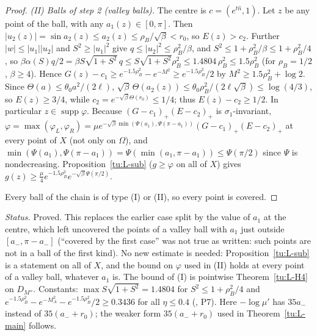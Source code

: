 \begin{proof}
\emph{(II) Balls of step 2 (valley balls).} The centre is $c=(e^{t\hat n},1)$. Let $z$ be any point of the ball, with any $a_1(z)\in[0,\pi]$.
Then $|u_2(z)|=\sin a_2(z)\le a_2(z)\le\rho_B/\sqrt\beta<r_0$, so $E(z)>c_2$. Further $|w|\le|u_1||u_2|$ and $S^2\ge|u_1|^2$ give
$q\le|u_2|^2\le\rho_B^2/\beta$, and $S^2\le1+\rho_B^2/\beta\le1+\rho_B^2/4$, so
$\beta\alpha(S)q/2=\beta S\sqrt{1+S^2}\,q\le S\sqrt{1+S^2}\rho_B^2\le1.4804\,\rho_B^2\le1.5\rho_B^2$ (for $\rho_B=1/2$, $\beta\ge4$).
Hence $G(z)-c_1\ge e^{-1.5\rho_B^2}-e^{-M^2}\ge e^{-1.5\rho_B^2}/2$ by $M^2\ge1.5\rho_B^2+\log2$. Since
$\Theta(a)\le\theta_0a^2/(2\ell)$, $\sqrt\beta\,\Theta(a_2(z))\le\theta_0\rho_B^2/(2\ell\sqrt\beta)\le\log(4/3)$, so $E(z)\ge3/4$, while
$c_2=e^{-\sqrt\beta\Theta(r_0)}\le1/4$; thus $E(z)-c_2\ge1/2$. In particular $z\in\operatorname{supp}\varphi$. Because
$(G-c_1)_+(E-c_2)_+$ is $\sigma_1$-invariant, $\varphi=\max(\varphi_L,\varphi_R)=\mu e^{-\sqrt\beta\min(\Psi(a_1),\Psi(\pi-a_1))}(G-c_1)_+(E-c_2)_+$
at every point of $X$ (not only on $\Omega$), and $\min(\Psi(a_1),\Psi(\pi-a_1))=\Psi(\min(a_1,\pi-a_1))\le\Psi(\pi/2)$ since $\Psi$ is
nondecreasing. Proposition~\ref{tu:L-sub} ($g\ge\varphi$ on all of $X$) gives
$g(z)\ge\frac\mu4e^{-1.5\rho_B^2}e^{-\sqrt\beta\Psi(\pi/2)}$.

Every ball of the chain is of type (I) or (II), so every point is covered.
\end{proof}

\noindent\emph{Status.} Proved. This replaces the earlier case split by the value of $a_1$ at the centre, which left uncovered
the points of a valley ball with $a_1$ just outside $[a_-,\pi-a_-]$ (``covered by the first case'' was not true as written: such
points are not in a ball of the first kind). No new estimate is needed: Proposition~\ref{tu:L-sub} is a statement on all of $X$,
and the bound on $\varphi$ used in (II) holds at every point of a valley ball, whatever $a_1$ is. The bound of (I) is pointwise
Theorem~\ref{tu:L-H4} on $D_{M''}$. Constants: $\max S\sqrt{1+S^2}=1.4804$ for $S^2\le1+\rho_B^2/4$ and
$e^{-1.5\rho_B^2}-e^{-M_A^2}-e^{-1.5\rho_B^2}/2\ge0.3436$ for all $\eta\le0.4$ (, P7). Here $-\log\mu'$ has
$35a_-$ instead of $35(a_-+r_0)$; the weaker form $35(a_-+r_0)$ used in Theorem~\ref{tu:L-main} follows.
